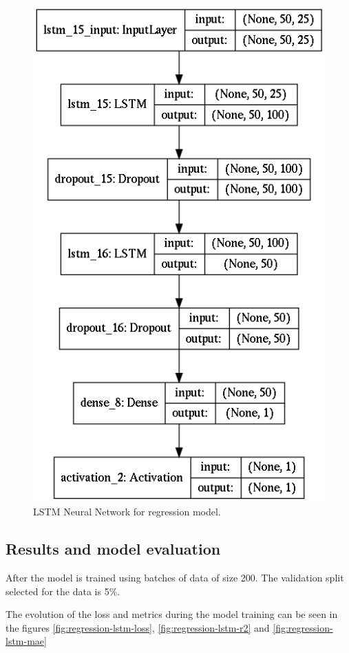 \begin{figure}[H]
\centering
\includegraphics[scale=0.5]{Figures/regression-lstm-model}
\decoRule
\caption[LSTM Neural Network for regression model]{LSTM Neural Network for regression model.}
\label{fig:regression-lstm-model}
\end{figure}

\subsection{Results and model evaluation}

After the model is trained using batches of data of size 200. The validation split selected for the data is 5\%.

The evolution of the loss and metrics during the model training can be seen in the figures \ref{fig:regression-lstm-loss}, \ref{fig:regression-lstm-r2} and \ref{fig:regression-lstm-mae}

